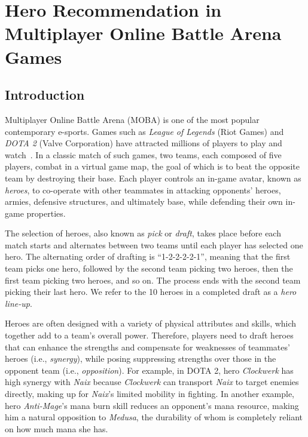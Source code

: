 \chapter{Hero Recommendation in Multiplayer Online Battle Arena Games} 

\label{chapter:draftart} 

\section{Introduction}

Multiplayer Online Battle Arena (MOBA) is one of the most popular contemporary e-sports. Games such as \textit{League of Legends} (Riot Games) and \textit{DOTA 2} (Valve Corporation) have attracted millions of players to play and watch~\cite{playerbase2014,27million}. In a classic match of such games, two teams, each composed of five players, combat in a virtual game map, the goal of which is to beat the opposite team by destroying their base. Each player controls an in-game avatar, known as \textit{heroes}, to co-operate with other teammates in attacking opponents' heroes, armies, defensive structures, and ultimately base, while defending their own in-game properties. 

The selection of heroes, also known as \textit{pick} or \textit{draft}, takes place before each match starts and alternates between two teams until each player has selected one hero. The alternating order of drafting is ``1-2-2-2-2-1'', meaning that the first team picks one hero, followed by the second team picking two heroes, then the first team picking two heroes, and so on. The process ends with the second team picking their last hero. We refer to the 10 heroes in a completed draft as a \textit{hero line-up}. 


Heroes are often designed with a variety of physical attributes and skills, which together add to a team's overall power. Therefore, players need to draft heroes that can enhance the strengths and compensate for weaknesses of teammates' heroes (i.e., \textit{synergy}), while posing suppressing strengths over those in the opponent team (i.e., \textit{opposition}). For example, in DOTA 2, hero \textit{Clockwerk} has high synergy with \textit{Naix} because \textit{Clockwerk} can transport \textit{Naix} to target enemies directly, making up for \textit{Naix}'s limited mobility in fighting. In another example, hero \textit{Anti-Mage}'s mana burn skill reduces an opponent's mana resource, making him a natural opposition to \textit{Medusa}, the durability of whom is completely reliant on how much mana she has.
 
